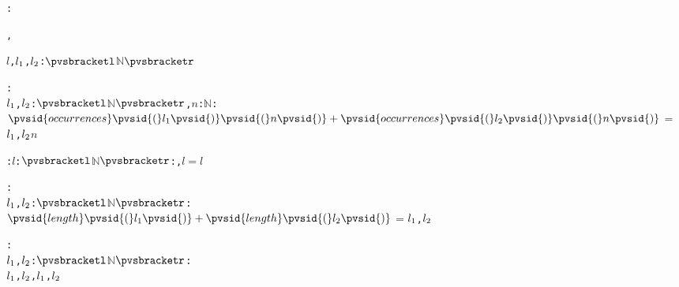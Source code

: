 \def\setsothermembertwofn#1#2{{(#1 \in #2)}}%
\def\opohtwofn#1#2{{#1\circ#2}}%
\def\opdividetwofn#1#2{{\frac{#1}{#2}}}%
\def\optimestwofn#1#2{{#1\times#2}}%
\def\opdifferenceonefn#1{{-#1}}%
\def\opdifferencetwofn#1#2{{#1-#2}}%
\def\opplustwofn#1#2{{#1+#2}}%
\begin{alltt}
: 

   , 

  \(l\), \(l\sb{1}\), \(l\sb{2}\):  \({\pvsbracketl}\)\(\mathbb{N}\)\({\pvsbracketr}\)\vspace*{\pvsdeclspacing}

  : 
     \pvsid{(}\(l\sb{1}\), \(l\sb{2}\): \({\pvsbracketl}\)\(\mathbb{N}\)\({\pvsbracketr}\), \(n\): \(\mathbb{N}\)\pvsid{)}:
      \(\opplustwofn{\pvsid{occurrences}\pvsid{(}l\sb{1}\pvsid{)}\pvsid{(}n\pvsid{)}}{\pvsid{occurrences}\pvsid{(}l\sb{2}\pvsid{)}\pvsid{(}n\pvsid{)}}\) \(=\)
       \pvsid{(}\pvsid{(}\(l\sb{1}\), \(l\sb{2}\)\pvsid{)}\pvsid{)}\pvsid{(}\(n\)\pvsid{)}\vspace*{\pvsdeclspacing}

  :   \pvsid{(}\(l\): \({\pvsbracketl}\)\(\mathbb{N}\)\({\pvsbracketr}\)\pvsid{)}: \pvsid{(}, \(l\)\pvsid{)} \(=\) \(l\)\vspace*{\pvsdeclspacing}

  : 
     \pvsid{(}\(l\sb{1}\), \(l\sb{2}\): \({\pvsbracketl}\)\(\mathbb{N}\)\({\pvsbracketr}\)\pvsid{)}:
      \(\opplustwofn{\pvsid{length}\pvsid{(}l\sb{1}\pvsid{)}}{\pvsid{length}\pvsid{(}l\sb{2}\pvsid{)}}\) \(=\) \pvsid{(}\pvsid{(}\(l\sb{1}\), \(l\sb{2}\)\pvsid{)}\pvsid{)}\vspace*{\pvsdeclspacing}

  : 
     \pvsid{(}\(l\sb{1}\), \(l\sb{2}\): \({\pvsbracketl}\)\(\mathbb{N}\)\({\pvsbracketr}\)\pvsid{)}:
      \pvsid{(}\pvsid{(}\(l\sb{1}\), \(l\sb{2}\)\pvsid{)}, \pvsid{(}\(l\sb{1}\), \(l\sb{2}\)\pvsid{)}\pvsid{)}\vspace*{\pvsdeclspacing}


\end{alltt}
